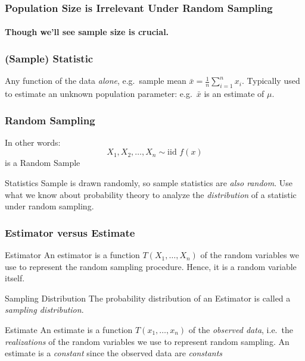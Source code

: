 \documentclass[handout]{beamer}
\begin{document}
\begin{frame}
  \frametitle{Population Size is Irrelevant Under Random Sampling}
  \framesubtitle{Though we'll see sample size is crucial.}

\end{frame}
\begin{frame}
  \frametitle{(Sample) Statistic}

  Any function of the data \emph{alone}, e.g.\ sample mean $\bar{x} = \frac{1}{n}\sum_{i=1}^n x_i$. Typically used to estimate an unknown population parameter: e.g.\ $\bar{x}$ is an estimate of $\mu$.

\end{frame}

\begin{frame}
\frametitle{Random Sampling}
In other words:
	$$X_1, X_2, \hdots, X_n \sim \mbox{iid } f(x)$$
is a \alert{Random Sample}

	\vspace{1em}
\begin{block}{Statistics}
Sample is drawn randomly, so sample statistics are \emph{also random}. Use what we know about probability theory to analyze the \emph{distribution} of a statistic under random sampling.
\end{block}
\end{frame}



\begin{frame}
\frametitle{Estimator versus Estimate}

\begin{block}{Estimator}
An estimator is a function $T(X_1, \hdots, X_n)$ of the random variables we use to represent the random sampling procedure. Hence, it is a random variable itself.
\end{block}
\pause
\begin{block}{Sampling Distribution}
The probability distribution of an Estimator is called a \emph{sampling distribution}.
\end{block}
\pause
\begin{block}{Estimate}
An estimate is a function $T(x_1, \hdots, x_n)$ of the \emph{observed data}, i.e.\ the \emph{realizations} of the random variables we use to represent random sampling. An estimate is a \emph{constant} since the observed data are \emph{constants}
\end{block}

\end{frame}
\end{document}

